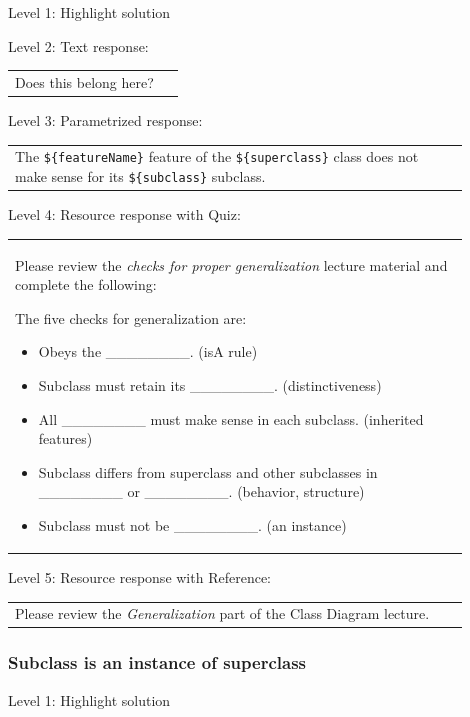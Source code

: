 \noindent Level 1: Highlight solution  \medskip

\noindent Level 2: Text response: \medskip

\begin{tabular}{|p{0.9\linewidth}}
Does this belong here?
\end{tabular} \medskip

\noindent Level 3: Parametrized response: \medskip

\begin{tabular}{|p{0.9\linewidth}}
The \verb|${featureName}| feature of the \verb|${superclass}| class does not make sense for its \verb|${subclass}| subclass.
\end{tabular} \medskip

\noindent Level 4: Resource response with Quiz: \medskip

\begin{tabular}{|p{0.9\linewidth}}
Please review the \textit{checks for proper generalization} lecture material
and complete the following:

The five checks for generalization are:
\begin{itemize}
    \item Obeys the \_\_\_\_\_\_\_\_. (isA rule)
    \item Subclass must retain its \_\_\_\_\_\_\_\_. (distinctiveness)
    \item All \_\_\_\_\_\_\_\_ must make sense in each subclass. (inherited features)
    \item Subclass differs from superclass and other subclasses in \_\_\_\_\_\_\_\_ or \_\_\_\_\_\_\_\_. (behavior, structure)
    \item Subclass must not be \_\_\_\_\_\_\_\_. (an instance)
\end{itemize}

\end{tabular} \medskip

\noindent Level 5: Resource response with Reference: \medskip

\begin{tabular}{|p{0.9\linewidth}}
Please review the \textit{Generalization} part of the Class Diagram lecture.
\end{tabular} \medskip


\subsubsection{Subclass is an instance of superclass}

\noindent Level 1: Highlight solution  \medskip

